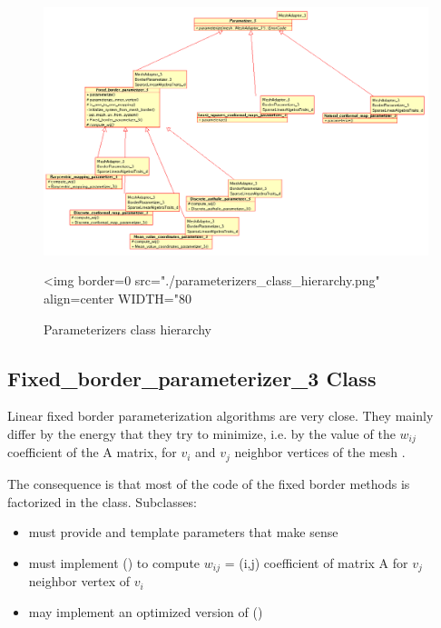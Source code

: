 \begin{figure}[bht]
    \begin{center}
        \begin{ccTexOnly}
            \includegraphics{Parameterization/parameterizers_class_hierarchy}
        \end{ccTexOnly}
        \begin{ccHtmlOnly}
            <img border=0 src="./parameterizers_class_hierarchy.png" align=center WIDTH="80%
        \end{ccHtmlOnly}
        \label{parameterization-fig-parameterizers_class_hierarchy}

        \caption{Parameterizers class hierarchy}
    \end{center}
\end{figure}


\subsection{Fixed\_border\_parameterizer\_3 Class}

Linear fixed border parameterization algorithms are very close. They mainly
differ by the energy that they try to minimize, i.e. by the value of the $w_{ij}$
coefficient of the A matrix, for $v_i$ and $v_j$ neighbor vertices of the mesh
\cite{cgal:fh-survey-05}.

The consequence is that most of the code of the fixed border methods
is factorized in the  class.
Subclasses:
\begin{itemize}
\item must provide  and  template parameters that make sense
\item must implement () to compute $w_{ij}$ = (i,j) coefficient of matrix A for $v_j$ neighbor vertex of $v_i$
\item may implement an optimized version of ()
\end{itemize}


